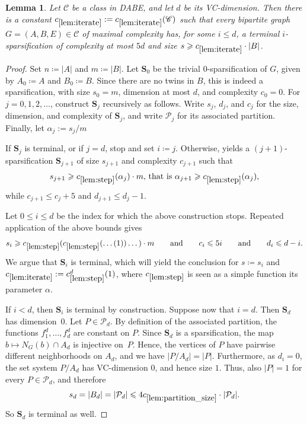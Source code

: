 \documentclass[11pt]{article}
\newtheorem{lemma}[theorem]{Lemma}
\theoremstyle{definition}
\newcommand{\CC}{{\mathscr C}}
\newcommand{\inducedSS}[2]{#1/#2}%
\renewcommand{\leq}{\leqslant}
\renewcommand{\le}{\leqslant}
\renewcommand{\ge}{\geqslant}
\renewcommand{\cal}{\mathcal}
\begin{document}
\begin{lemma}\label{lem:iterate}
Let $\CC$ be a class in DABE, and let $d$ be its VC-dimension.
Then there is a constant $c_{\ref{lem:iterate}} := c_{\ref{lem:iterate}}(\CC)$ such that every bipartite graph $G=(A,B,E) \in \CC$ of maximal complexity has, for some $i \le d$, a terminal $i$-sparsification  of complexity at most $5d$ and size $s \ge c_{\ref{lem:iterate}} \cdot |B|$.
\end{lemma}
\begin{proof}
  Set $n\coloneqq|A|$ and $m\coloneqq|B|$.
Let $\mathbf S_0$ be the trivial $0$-sparsification of $G$, given by
$A_0\coloneqq A$ and $B_0\coloneqq B$.
Since there are no twins in $B$, this is indeed a sparsification, with
size $s_0=m$, dimension at most $d$, and complexity $c_0=0$.
For $j=0,1,2,\ldots$, construct $\mathbf S_j$ recursively as follows.
Write $s_j$, $d_j$, and $c_j$ for the size, dimension, and
complexity of $\mathbf S_j$, and write $\cal P_j$ for its associated
partition. Finally, let $\alpha_j := s_j/m$

If $\mathbf S_j$ is terminal, or if $j=d$, stop and set $i\coloneqq j$.
Otherwise,  yields a $(j+1)$-sparsification
$\mathbf S_{j+1}$ of size $s_{j+1}$ and complexity $c_{j+1}$ such that
\[
  s_{j+1}
  \ge c_{\ref{lem:step}}(\alpha_j) \cdot m \text{, that is } \alpha_{j+1} \ge c_{\ref{lem:step}}(\alpha_j),
\]
while $c_{j+1}\le c_j+5$ and $d_{j+1}\le d_j-1$.

Let $0 \leq i \leq d$ be the index for which the above construction stops.
Repeated application of the above bounds
gives
\[
  s_i\ge c_{\ref{lem:step}}(c_{\ref{lem:step}}(\dots (1))\dots) \cdot m
  \qquad\text{and}\qquad
  c_i\le 5i\qquad\text{and}\qquad d_i\le d-i.
\]
We argue that $\mathbf S_i$ is terminal,
which will yield the conclusion for $s\coloneqq s_i$ and $c_{\ref{lem:iterate}} := c_{\ref{lem:step}}^d(1)$, where $c_{\ref{lem:step}}$ is seen as a simple function its parameter $\alpha$.

If $i<d$, then $\mathbf S_i$ is terminal by construction.
Suppose now that $i=d$.
Then $\mathbf S_d$ has dimension~$0$.
Let $P\in\cal P_d$.
By definition of the associated partition, the functions
$f^d_1,\ldots,f^d_d$ are constant on $P$.
Since $\mathbf S_d$ is a sparsification, the map
$b\mapsto N_G(b)\cap A_d$ is injective on~$P$. 
Hence, the vertices of $P$ have pairwise different neighborhoods on $A_d$, and we have $|\inducedSS{P}{A_d}| = |P|$.
Furthermore, as $d_i=0$, the set system $\inducedSS{P}{A_d}$ has VC-dimension $0$,
and hence size $1$.
Thus, also $|P|=1$ for every $P\in\cal P_d$, and therefore
\[
  s_d=|B_d|=|\cal P_d|\le 4c_{\ref{lem:partition_size}} \cdot |\cal P_d|.
\]
So $\mathbf S_d$ is terminal as well.
\end{proof}
\end{document}
